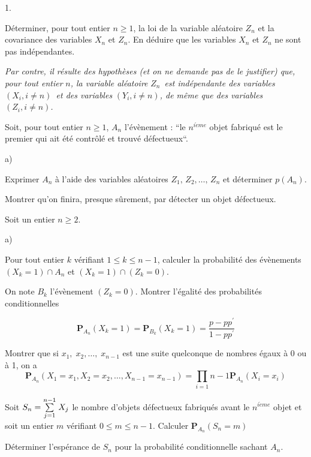 \documentclass[11pt]{article}%
\begin{document}
\begin{noliste}{1.}
 \setlength{\itemsep}{4mm}
\item Déterminer, pour tout entier $n\geq 1$, la loi de la variable
aléatoire $Z_{n}$ et la covariance des variables $X_{n}$ et $Z_{n}$. En
déduire
que les variables $X_{n}$ et $Z_{n}$ ne sont pas indépendantes.

\textsl{Par contre, il résulte des hypothèses (et on ne demande pas de
le
justifier) que, pour tout entier }$n$\textsl{, la variable aléatoire
}$Z_{n}$\textsl{\ est indépendante des variables }$\left( X_{i},i\ne
n\right) $\textsl{\ et des variables }$\left( Y_{i},i\ne n\right)
$\textsl{, de même
que des variables }$\left( Z_{i},i\ne n\right) $\textsl{.}

\item Soit, pour tout entier $n\geq 1$, $A_{n}$ l'évènement :
\textquotedblleft le $n^{i\grave{e}me}$ objet fabriqué est le premier
qui
ait été contrôlé et trouvé défectueux\textquotedblleft.

\begin{noliste}{a)}
 \setlength{\itemsep}{2mm}
\item Exprimer $A_{n}$ à l'aide des variables aléatoires
$Z_{1},\,Z_{2},\dots,\,Z_{n}$ et déterminer $p\left( A_{n}\right) $.

\item Montrer qu'on finira, presque sûrement, par détecter un objet
défectueux.
\end{noliste}

\item Soit un entier $n\geq 2$.

\begin{noliste}{a)}
 \setlength{\itemsep}{2mm}
\item Pour tout entier $k$ vérifiant $1\leq k\leq n-1$, calculer
la probabilité des évènements \\
$\left( X_{k} = 1\right) \cap A_{n}$ et $\left( X_{k} = 1\right) \cap
\left(
Z_{k} = 0\right) $.

On note $B_{k}$ l'évènement $\left( Z_{k} = 0\right) $. Montrer
l'égalité des
probabilités conditionnelles

\[
\mathbf{P}_{A_{n}}\left( X_{k} = 1\right) = \mathbf{P}_{B_{k}}\left(
X_{k} = 1\right) = \dfrac{p-pp^{\prime }}{1-pp^{\prime }}
\]

\item Montrer que si $x_{1},\;x_{2},\dots,\;x_{n-1}$ est une suite
quelconque de nombres égaux à 0 ou à 1, on a 
\[
\mathbf{P}_{A_{n}}\left( X_{1} = x_{1},X_{2} = x_{2},\dots,X_{n-1} =
x_{n-1}\right) = \prod_{i = 1}{n-1}\mathbf{P}_{A_{n}}\left(
X_{i} = x_{i}\right)
\]

\item Soit $S_{n} = {\textstyle\sum\limits_{j = 1}^{n-1}}\hspace{.1cm}X_{j}$ le nombre d'objets
défectueux fabriqués avant le $n^{i\grave{e}me}$ objet et soit un
entier $m$ vérifiant $0\leq m\leq n-1$. Calculer
$\mathbf{P}_{A_{n}}\left(
S_{n} = m\right) $

\item Déterminer l'espérance de $S_{n}$ pour la probabilité
conditionnelle
sachant $A_{n}$.
\end{noliste}
\end{noliste}

\label{fin}
\end{document}

